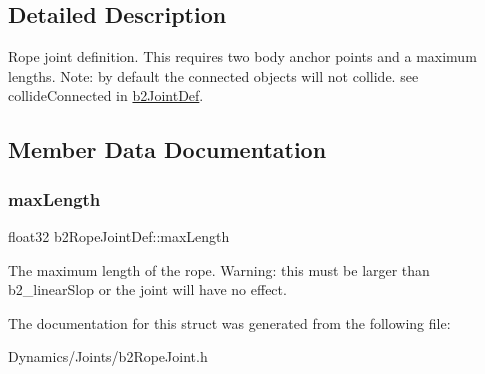 \subsection{Detailed Description}
Rope joint definition. This requires two body anchor points and a maximum lengths. Note\+: by default the connected objects will not collide. see collide\+Connected in \mbox{\hyperlink{structb2JointDef}{b2\+Joint\+Def}}. 

\subsection{Member Data Documentation}
\mbox{\label{structb2RopeJointDef_a6efdcae22e2bdcfc3aae62da1a5f0d69}} 
\subsubsection{\texorpdfstring{max\+Length}{maxLength}}
{\footnotesize\ttfamily float32 b2\+Rope\+Joint\+Def\+::max\+Length}

The maximum length of the rope. Warning\+: this must be larger than b2\+\_\+linear\+Slop or the joint will have no effect. 

The documentation for this struct was generated from the following file\+:\begin{DoxyCompactItemize}
\item 
Dynamics/\+Joints/b2\+Rope\+Joint.\+h\end{DoxyCompactItemize}
